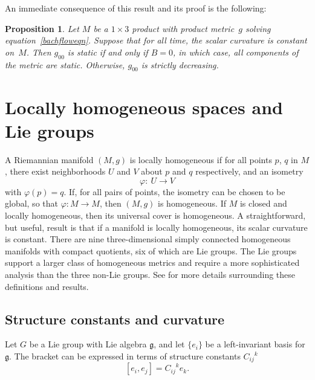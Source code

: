 \documentclass[pdftex]{sigma}
\numberwithin{equation}{section}
\newtheorem{Proposition}[Theorem]{Proposition}
 { \theoremstyle{definition}
\newtheorem{Definition}[Theorem]{Definition}
\newtheorem{Example}[Theorem]{Example}
\newtheorem{Remark}[Theorem]{Remark} }
\begin{document}
An immediate consequence of this result and its proof is the following:

\begin{Proposition} \label{g00monotonicprop}
Let $M$ be a $1 \times 3$ product with product metric~$g$ solving equation~\eqref{bachfloweqn}. Suppose that for all time, the scalar curvature is constant on~$M$. Then $g_{00}$ is static if and only if $B = 0$, in which case, all components of the metric are static. Otherwise, $g_{00}$ is strictly decreasing.
\end{Proposition}

\section{Locally homogeneous spaces and Lie groups} \label{spacebackgroundsec}

A Riemannian manifold $(M, g)$ is locally homogeneous if for all points $p$, $q$ in $M$, there exist neighborhoods $U$ and $V$ about $p$ and $q$ respectively, and an isometry
\[
\varphi\colon \ U \rightarrow V
\]
with $\varphi(p) = q$. If, for all pairs of points, the isometry can be chosen to be global, so that $\varphi\colon M \rightarrow M$, then $(M, g)$ is homogeneous. If $M$ is closed and locally homogeneous, then its universal cover is homogeneous. A straightforward, but useful, result is that if a manifold is locally homogeneous, its scalar curvature is constant. There are nine three-dimensional simply connected homogeneous manifolds with compact quotients, six of which are Lie groups. The Lie groups support a larger class of homogeneous metrics and require a more sophisticated analysis than the three non-Lie groups. See \cite{IJ} for more details surrounding these definitions and results.

\subsection{Structure constants and curvature}

Let $G$ be a Lie group with Lie algebra $\mathfrak{g}$, and let $\{e_i\}$ be a left-invariant basis for $\mathfrak{g}$. The bracket can be expressed in terms of structure constants ${C_{ij}}^k$
\[
[e_i, e_j] = {C_{ij}}^k e_k.
\]
\end{document}
